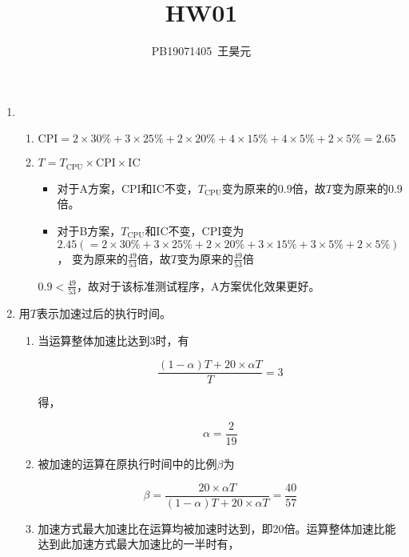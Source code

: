\documentclass{article}
\title{HW01}
\author{PB19071405\ 王昊元}
\begin{document}
    \pagestyle{empty}

    \maketitle
    \thispagestyle{empty}  %

    \begin{enumerate}[label=\textbf{EX\arabic*}]
        \item \begin{enumerate}[label=1.\arabic*]
            \item $\text{CPI} = 2 \times 30\% + 3 \times 25\% + 2 \times 20\% + 4 \times 15\% + 4 \times 5\% + 2 \times 5\% = 2.65$
            \item $T = T_{\text{CPU}} \times \text{CPI} \times \text{IC}$

            \begin{itemize}
                \item 对于A方案，CPI和IC不变，$T_{\text{CPU}}$变为原来的$0.9$倍，故$T$变为原来的$0.9$倍。
                \item 对于B方案，$T_{\text{CPU}}$和IC不变，CPI变为$2.45 (= 2 \times 30\% + 3 \times 25\% + 2 \times 20\% + 3 \times 15\% + 3 \times 5\% + 2 \times 5\%)$，
                变为原来的$\frac{49}{53}$倍，故$T$变为原来的$\frac{49}{53}$倍
            \end{itemize}
        
            $0.9 < \frac{49}{53}$，故对于该标准测试程序，A方案优化效果更好。
        \end{enumerate}
        \item 用$T$表示加速过后的执行时间。
        \begin{enumerate}[label=2.\arabic*]

            \item 当运算整体加速比达到3时，有

            $$\frac{(1-\alpha)T + 20 \times \alpha T}{T} = 3$$
        
            得，
        
            $$\alpha = \frac{2}{19}$$

            \item 被加速的运算在原执行时间中的比例$\beta$为
            
            $$\beta = \frac{20 \times \alpha T}{(1-\alpha)T + 20 \times \alpha T} = \frac{40}{57}$$

            \item 加速方式最大加速比在运算均被加速时达到，即20倍。运算整体加速比能达到此加速方式最大加速比的一半时有，
            

\end{enumerate}
\end{enumerate}
\end{document}
